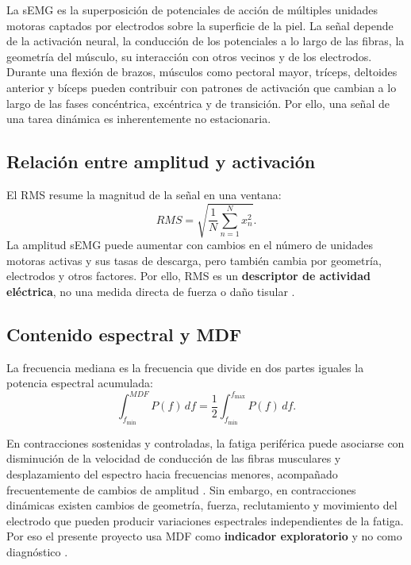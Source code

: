 \documentclass[11pt,spanish]{article}
\begin{document}
La sEMG es la superposición de potenciales de acción de múltiples unidades motoras captados por electrodos sobre la superficie de la piel. La señal depende de la activación neural, la conducción de los potenciales a lo largo de las fibras, la geometría del músculo, su interacción con otros vecinos y de los electrodos.
Durante una flexión de brazos, músculos como pectoral mayor, tríceps, deltoides anterior y bíceps pueden contribuir con patrones de activación que cambian a lo largo de las fases concéntrica, excéntrica y de transición. Por ello, una señal de una tarea dinámica es inherentemente no estacionaria.

\subsection{Relación entre amplitud y activación}

El RMS resume la magnitud de la señal en una ventana:
\begin{equation}
RMS=\sqrt{\frac{1}{N}\sum_{n=1}^{N}x_n^2}.
\end{equation}
La amplitud sEMG puede aumentar con cambios en el número de unidades motoras activas y sus tasas de descarga, pero también cambia por geometría, electrodos y otros factores. Por ello, RMS es un \textbf{descriptor de actividad eléctrica}, no una medida directa de fuerza o daño tisular \cite{hug2020,defreitas2020}.

\subsection{Contenido espectral y MDF}

La frecuencia mediana es la frecuencia que divide en dos partes iguales la potencia espectral acumulada:
\begin{equation}
\int_{f_{\min}}^{MDF}P(f)\,df
=
\frac{1}{2}\int_{f_{\min}}^{f_{\max}}P(f)\,df.
\end{equation}

En contracciones sostenidas y controladas, la fatiga periférica puede asociarse con disminución de la velocidad de conducción de las fibras musculares y desplazamiento del espectro hacia frecuencias menores, acompañado frecuentemente de cambios de amplitud \cite{hug2020}. Sin embargo, en contracciones dinámicas existen cambios de geometría, fuerza, reclutamiento y movimiento del electrodo que pueden producir variaciones espectrales independientes de la fatiga. Por eso el presente proyecto usa MDF como \textbf{indicador exploratorio} y no como diagnóstico \cite{hug2024,zwarts1999}.
\end{document}
